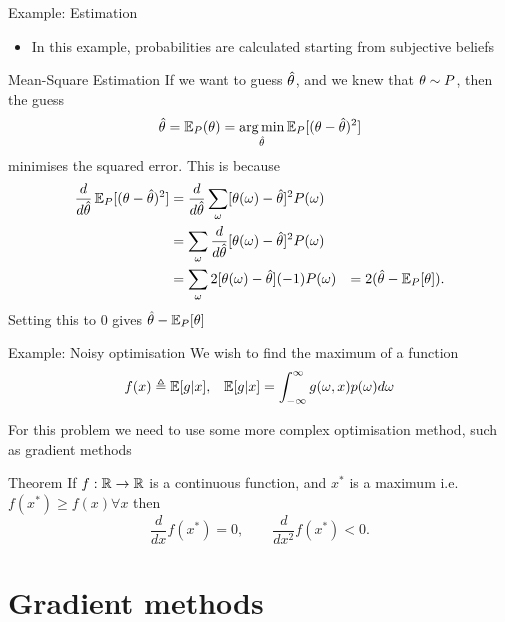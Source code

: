 \documentclass[smaller]{beamer}
\begin{document}
\begin{frame}[label={sec:org3968f18}]{Example: Estimation}
\begin{itemize}
\item In this example, probabilities are calculated starting from subjective beliefs
\end{itemize}
\begin{block}{Mean-Square Estimation}
If we want to guess \(\hat{\theta}\), and we knew that \(\theta \sim P\), then the guess
\[
\hat{\theta} = \mathop{\mbox{\ensuremath{\mathbb{E}}}}\nolimits_P(\theta) = \operatorname*{arg\,min}_{\hat{\theta}} \mathop{\mbox{\ensuremath{\mathbb{E}}}}\nolimits_P [(\theta - \hat{\theta})^2]
\]
minimises the squared error. This is because
\begin{align}
\frac{d}{d \hat{\theta}}
 \mathop{\mbox{\ensuremath{\mathbb{E}}}}\nolimits_P [(\theta - \hat{\theta})^2]
&=
\frac{d}{d \hat{\theta}}
 \sum_\omega [\theta(\omega) -  \hat{\theta}]^2 P(\omega)\\
&=
 \sum_\omega \frac{d}{d \hat{\theta}}
 [\theta(\omega) -  \hat{\theta}]^2 P(\omega)\\
&=
 \sum_\omega 2 [\theta(\omega) -  \hat{\theta}] (-1) P(\omega)
&=
	 2 (\hat{\theta} - \mathop{\mbox{\ensuremath{\mathbb{E}}}}\nolimits_P [\theta]).
\end{align}
Setting this to \(0\) gives \(\hat{\theta} - \mathop{\mbox{\ensuremath{\mathbb{E}}}}\nolimits_P [\theta]\)
\end{block}
\end{frame}

\begin{frame}[label={sec:org937d29e}]{Example: Noisy optimisation}
We wish to find the maximum of a function
\begin{align}
f(x) &\mathrel{\triangleq} \mathop{\mbox{\ensuremath{\mathbb{E}}}}\nolimits[g | x],
&
\mathop{\mbox{\ensuremath{\mathbb{E}}}}\nolimits[g | x] = \int_{- \infty}^\infty g(\omega, x) p(\omega) d\omega
\end{align}

For this problem we need to use some more complex optimisation method, such as gradient methods

\begin{block}{Theorem}
If \(f: \mathbb{R} \to \mathbb{R}\) is a continuous function, and \(x^*\) is a maximum i.e. \(f(x^*) \geq f(x) \forall x\) then
\[
\frac{d}{dx} f(x^*) = 0,
\qquad
\frac{d}{dx^2} f(x^*) < 0.
\]
\end{block}
\end{frame}
\section{Gradient methods}
\label{sec:org861e3dc}
\end{document}
